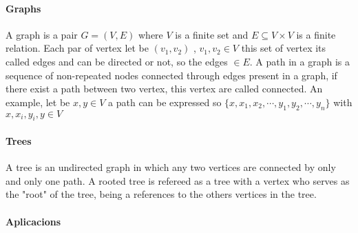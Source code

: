 
\paragraph{Graphs} A graph is a pair $G = (V, E)$ where $V$ is a finite set and $E \subseteq V\times V$ is a finite relation. Each par of vertex let be $(v_{1},v_{2})$ , $v_{1},v_{2} \in V$ this set of vertex its called edges and can be directed or not, so the edges $\in E$. A path in a graph is a sequence of non-repeated nodes connected through edges present in a graph, if there exist a path between two vertex, this vertex are called connected. An example, let be $x,y \in V$ a path can be expressed so $\{x,x_{1},x_{2},\cdots,y_{1},y_{2},\cdots,y_{n} \}$ with $x,x_{i},y_{i},y \in V$

\paragraph{Trees} A tree is an undirected graph in which any two vertices are connected by only and only one path. A rooted tree is refereed as a tree with a vertex who serves as the "root" of the tree, being a references to the others  vertices in the tree.  

\paragraph{Aplicacions}   



